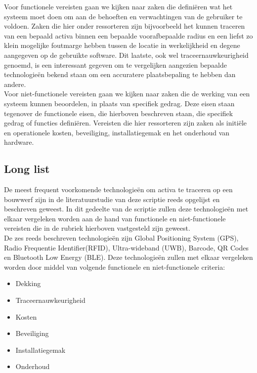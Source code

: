 Voor functionele vereisten gaan we kijken naar zaken die definiëren wat het systeem moet doen om aan de behoeften en verwachtingen van de gebruiker te voldoen. Zaken die hier onder ressorteren zijn bijvoorbeeld het kunnen traceren van een bepaald activa binnen een bepaalde voorafbepaalde radius en een liefst zo klein mogelijke foutmarge hebben tussen de locatie in werkelijkheid en degene aangegeven op de gebruikte software. Dit laatste, ook wel traceernauwkeurigheid genoemd, is een interessant gegeven om te vergelijken aangezien bepaalde technologieën bekend staan om een accuratere plaatsbepaling te hebben dan andere.\\

Voor niet-functionele vereisten gaan we kijken naar zaken die de werking van een systeem kunnen beoordelen, in plaats van specifiek gedrag. Deze eisen staan tegenover de functionele eisen, die hierboven beschreven staan, die specifiek gedrag of functies definiëren. Vereisten die hier ressorteren zijn zaken als initiële en operationele kosten, beveiliging, installatiegemak en het onderhoud van hardware.

\subsection{Long list}
De meest frequent voorkomende technologieën om activa te traceren op een bouwwerf zijn in de literatuurstudie van deze scriptie reeds opgelijst en beschreven geweest. In dit gedeelte van de scriptie zullen deze technologieën met elkaar vergeleken worden aan de hand van functionele en niet-functionele vereisten die in de rubriek hierboven vastgesteld zijn geweest.\\

De zes reeds beschreven technologieën zijn Global Positioning System (GPS), Radio Frequentie Identifier(RFID), Ultra-wideband (UWB), Barcode, QR Codes en Bluetooth Low Energy (BLE). Deze technologieën zullen met elkaar vergeleken worden door middel van volgende functionele en niet-functionele criteria:

\begin{itemize}
    \item Dekking
    \item Traceernauwkeurigheid
    \item Kosten
    \item Beveiliging
    \item Installatiegemak
    \item Onderhoud
\end{itemize}

